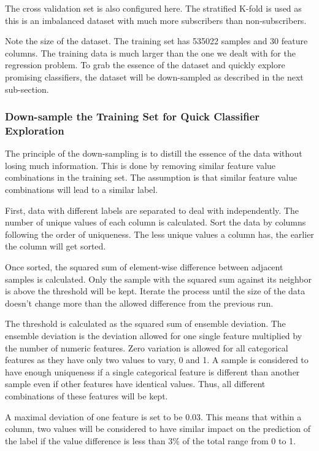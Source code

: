 \documentclass[a4paper]{article}
\begin{document}
			The cross validation set is also configured here. The stratified K-fold is used as this is an imbalanced dataset with much more subscribers than non-subscribers.
			
			Note the size of the dataset. The training set has 535022 samples and 30 feature columns. The training data is much larger than the one we dealt with for the regression problem. To grab the essence of the dataset and quickly explore promising classifiers, the dataset will be down-sampled as described in the next sub-section.			
			
			\subsubsection{Down-sample the Training Set for Quick Classifier Exploration}
			The principle of the down-sampling is to distill the essence of the data without losing much information. This is done by removing similar feature value combinations in the training set. The assumption is that similar feature value combinations will lead to a similar label.
			
			First, data with different labels are separated to deal with independently. The number of unique values of each column is calculated. Sort the data by columns following the order of uniqueness. The less unique values a column has, the earlier the column will get sorted. 
			
			Once sorted, the squared sum of element-wise difference between adjacent samples is calculated. Only the sample with the squared sum against its neighbor is above the threshold will be kept. Iterate the process until the size of the data doesn't change more than the allowed difference from the previous run.
			
			The threshold is calculated as the squared sum of ensemble deviation. The ensemble deviation is the deviation allowed for one single feature multiplied by the number of numeric features. Zero variation is allowed for all categorical features as they have only two values to vary, 0 and 1. A sample is considered to have enough uniqueness if a single categorical feature is different than another sample even if other features have identical values. Thus, all different combinations of these features will be kept.
			
			A maximal deviation of one feature is set to be 0.03. This means that within a column, two values will be considered to have similar impact on the prediction of the label if the value difference is less than 3\% of the total range from 0 to 1. 
			
\end{document}
